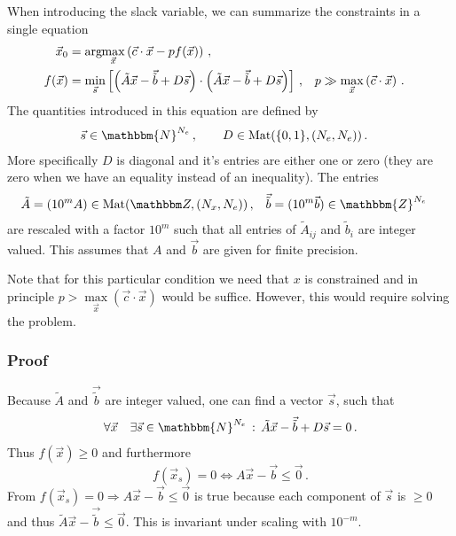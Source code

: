 \documentclass[]{article}
\newcommand{\argmax}[1]{\text{arg}\hspace{-2pt}\max\limits_{#1}}
\newcommand{\assumption}[1]{{\color{red}#1}}
\begin{document}
When introducing the slack variable, we can summarize the constraints in a single equation
\begin{align}\label{slack-optimization}
	\vec x_0 &= \argmax{\vec x} \left( \vec c \cdot \vec x - p f(\vec x) \right) \, , \\
	f(\vec x) &= \min\limits_{\vec s}\left[
		\left(\tilde A \vec x - \vec{\tilde{b}} + D \vec s\right) \cdot \left(\tilde A \vec x - \vec{\tilde{b}} + D \vec s\right)
	\right] \, , &
	p &\gg \max\limits_{\vec x}\left(\vec c \cdot \vec x\right) \, .
\end{align}
The quantities introduced in this equation are defined by
\begin{align}
	\vec s &\in \mathbbm{N}^{N_e} \, , \qquad
	D \in \text{Mat}(\{0, 1\}, (N_e, N_e)) \, .
\end{align}
More specifically $D$ is diagonal and it's entries are either one or zero (they are zero when we have an equality instead of an inequality).
The entries 
\begin{align}
	\tilde A = (10^{m} A) & \in \text{Mat}(\mathbbm Z, (N_x, N_e)) \, , &
	\vec{\tilde{b}} &= (10^m \vec{b}) \in \mathbbm{Z}^{N_e}
\end{align}
are rescaled with a factor $10^m$ such that all entries of $\tilde A_{ij}$ and $\tilde b_{i}$ are integer valued.
\assumption{This assumes that $A$ and $\vec b$ are given for finite precision.}

Note that \assumption{for this particular condition we need that $x$ is constrained} and in principle \assumption{$p > \max\limits_{\vec x}\left(\vec c \cdot \vec x\right)$} would be suffice.
However, this would require solving the problem.


\subsubsection{Proof}
Because $\tilde A$ and $\vec{\tilde{b}}$ are integer valued, one can find a vector $\vec s$, such that 
\begin{equation}
	\forall \vec x \quad \exists \vec s \in \mathbbm{N}^{N_e} \, : \, \tilde A \vec x - \vec{\tilde{b}} + D \vec s = 0 \, .
\end{equation}
Thus $f(\vec x) \geq 0$ and furthermore
\begin{equation}
	f(\vec x_s) = 0 \iff A \vec x - \vec{b} \leq \vec 0 \, .
\end{equation}
From $f(\vec x_s) = 0 \Rightarrow A \vec x - \vec{b} \leq \vec 0$ is true because each component of $\vec s$ is $\geq 0$ and thus $\tilde A \vec x - \vec{\tilde{b}} \leq \vec 0$.
This is invariant under scaling with $10^{-m}$.
\end{document}
